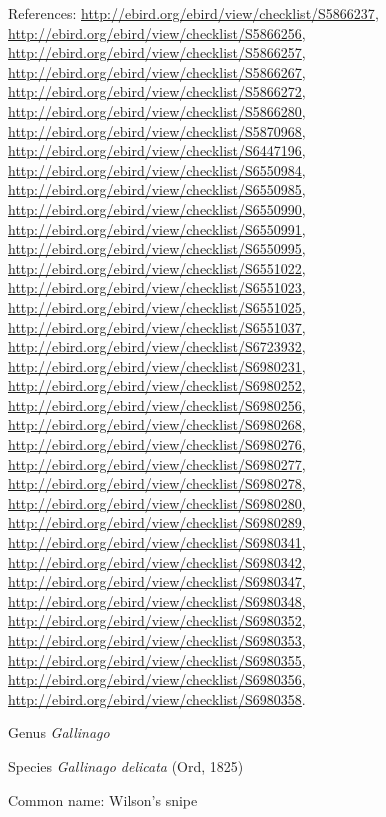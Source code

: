 \documentclass[9pt, article]{memoir}
\begin{document}
\begin{multicols}{2}
References: 
\url{http://ebird.org/ebird/view/checklist/S5866237}, 
\url{http://ebird.org/ebird/view/checklist/S5866256}, 
\url{http://ebird.org/ebird/view/checklist/S5866257}, 
\url{http://ebird.org/ebird/view/checklist/S5866267}, 
\url{http://ebird.org/ebird/view/checklist/S5866272}, 
\url{http://ebird.org/ebird/view/checklist/S5866280}, 
\url{http://ebird.org/ebird/view/checklist/S5870968}, 
\url{http://ebird.org/ebird/view/checklist/S6447196}, 
\url{http://ebird.org/ebird/view/checklist/S6550984}, 
\url{http://ebird.org/ebird/view/checklist/S6550985}, 
\url{http://ebird.org/ebird/view/checklist/S6550990}, 
\url{http://ebird.org/ebird/view/checklist/S6550991}, 
\url{http://ebird.org/ebird/view/checklist/S6550995}, 
\url{http://ebird.org/ebird/view/checklist/S6551022}, 
\url{http://ebird.org/ebird/view/checklist/S6551023}, 
\url{http://ebird.org/ebird/view/checklist/S6551025}, 
\url{http://ebird.org/ebird/view/checklist/S6551037}, 
\url{http://ebird.org/ebird/view/checklist/S6723932}, 
\url{http://ebird.org/ebird/view/checklist/S6980231}, 
\url{http://ebird.org/ebird/view/checklist/S6980252}, 
\url{http://ebird.org/ebird/view/checklist/S6980256}, 
\url{http://ebird.org/ebird/view/checklist/S6980268}, 
\url{http://ebird.org/ebird/view/checklist/S6980276}, 
\url{http://ebird.org/ebird/view/checklist/S6980277}, 
\url{http://ebird.org/ebird/view/checklist/S6980278}, 
\url{http://ebird.org/ebird/view/checklist/S6980280}, 
\url{http://ebird.org/ebird/view/checklist/S6980289}, 
\url{http://ebird.org/ebird/view/checklist/S6980341}, 
\url{http://ebird.org/ebird/view/checklist/S6980342}, 
\url{http://ebird.org/ebird/view/checklist/S6980347}, 
\url{http://ebird.org/ebird/view/checklist/S6980348}, 
\url{http://ebird.org/ebird/view/checklist/S6980352}, 
\url{http://ebird.org/ebird/view/checklist/S6980353}, 
\url{http://ebird.org/ebird/view/checklist/S6980355}, 
\url{http://ebird.org/ebird/view/checklist/S6980356}, 
\url{http://ebird.org/ebird/view/checklist/S6980358}.

\vspace{6pt}\noindent\hspace{30pt}Genus \textit{Gallinago}


\vspace{6pt}\noindent\hspace{36pt}Species \textit{Gallinago delicata} (Ord, 1825)


Common name: Wilson's snipe


\end{multicols}
\end{document}

